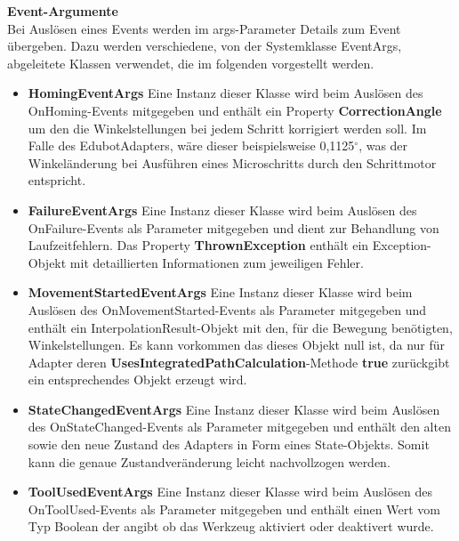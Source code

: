 \textbf{Event-Argumente}\\
Bei Auslösen eines Events werden im args-Parameter Details zum Event übergeben. Dazu werden verschiedene, von der Systemklasse EventArgs, abgeleitete Klassen verwendet, die im folgenden vorgestellt werden.
\begin{itemize}
\item \textbf{HomingEventArgs}
Eine Instanz dieser Klasse wird beim Auslösen des OnHoming-Events mitgegeben und enthält ein Property \textbf{CorrectionAngle} um den die Winkelstellungen bei jedem Schritt korrigiert werden soll. Im Falle des EdubotAdapters, wäre dieser beispielsweise 0,1125$^\circ$, was der Winkeländerung bei Ausführen eines Microschritts durch den Schrittmotor entspricht.
\item \textbf{FailureEventArgs}
Eine Instanz dieser Klasse wird beim Auslösen des OnFailure-Events als Parameter mitgegeben und dient zur Behandlung von Laufzeitfehlern. Das Property \textbf{ThrownException} enthält ein Exception-Objekt mit detaillierten Informationen zum jeweiligen Fehler. \\
\item \textbf{MovementStartedEventArgs}
Eine Instanz dieser Klasse wird beim Auslösen des OnMovementStarted-Events als Parameter mitgegeben und enthält ein InterpolationResult-Objekt mit den, für die Bewegung benötigten, Winkelstellungen. Es kann vorkommen das dieses Objekt null ist, da nur für Adapter deren \textbf{UsesIntegratedPathCalculation}-Methode \textbf{true} zurückgibt ein entsprechendes Objekt erzeugt wird. \\
\item \textbf{StateChangedEventArgs}
Eine Instanz dieser Klasse wird beim Auslösen des OnStateChanged-Events als Parameter mitgegeben und enthält den alten sowie den neue Zustand des Adapters in Form eines State-Objekts. Somit kann die genaue Zustandveränderung leicht nachvollzogen werden.\\
\item \textbf{ToolUsedEventArgs}
Eine Instanz dieser Klasse wird beim Auslösen des OnToolUsed-Events als Parameter mitgegeben und enthält einen Wert vom Typ Boolean der angibt ob das Werkzeug aktiviert oder deaktivert wurde.\\
\end{itemize}
